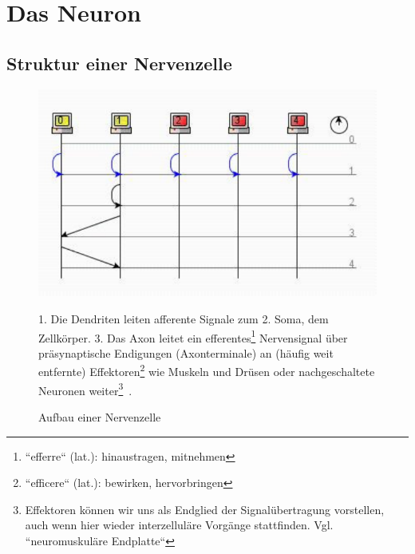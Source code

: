 \chapter{Das Neuron}

\section{Struktur einer Nervenzelle}

\begin{figure}[h]
	\centering
		\includegraphics{images/p1ReadSeq.pdf}
\caption{Aufbau einer Nervenzelle}
\small
 1. Die Dendriten leiten
 afferente Signale zum
 2. Soma, dem Zellkörper.
 3. Das Axon leitet ein
 efferentes\footnote{``efferre`` (lat.): hinaustragen, mitnehmen} Nervensignal über präsynaptische Endigungen (Axonterminale) an (häufig weit entfernte)
 Effektoren\footnote{``efficere`` (lat.): bewirken, hervorbringen}
    wie Muskeln und Drüsen oder nachgeschaltete Neuronen
 weiter\footnote{
     Effektoren können wir uns als Endglied der Signalübertragung vorstellen, auch wenn hier wieder interzelluläre Vorgänge stattfinden. Vgl. ``neuromuskuläre Endplatte``\cite[127, Abs. 3]{BCP18}
    }~\cite[42]{SD07}.

\end{figure}



